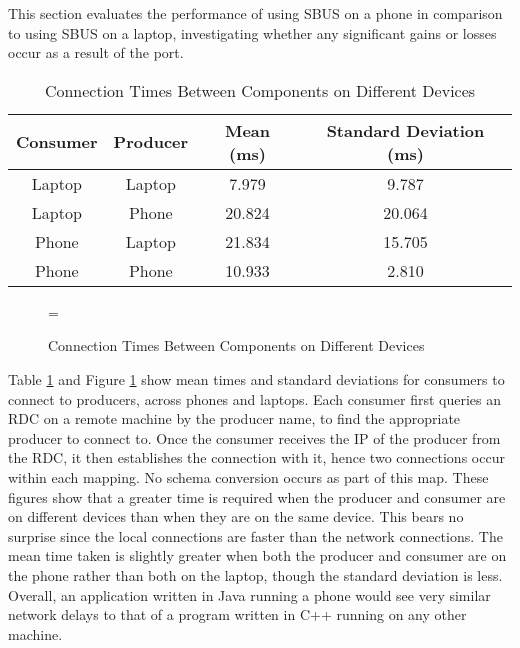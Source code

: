 \documentclass[12pt,twoside,notitlepage]{report}
\begin{document}
This section evaluates the performance of using SBUS on a phone in comparison to using SBUS on a laptop, investigating whether any significant gains or losses occur as a result of the port.

\begin{table}[tbh]
\centering

\begin{tabular}{c c c c}
\hline\hline

Consumer & Producer & Mean (ms) & Standard Deviation (ms) \\
\hline

Laptop	&	Laptop	& 7.979 	& 9.787 \\
Laptop	&	Phone	& 20.824 	& 20.064 \\
Phone	&	Laptop	& 21.834	& 15.705 \\
Phone	& 	Phone	& 10.933	& 2.810 \\
\hline
\end{tabular}

\caption{Connection Times Between Components on Different Devices}
\label{tab:map_times}
\end{table}

\begin{figure}[tbh]
\epsfxsize=\hsize
\centerline{}
\caption{Connection Times Between Components on Different Devices}
\label{fig:map_times}
\end{figure}

Table \ref{tab:map_times} and Figure \ref{fig:map_times} show mean times and standard deviations for consumers to connect to producers, across phones and laptops.
Each consumer first queries an RDC on a remote machine by the producer name, to find the appropriate producer to connect to. 
Once the consumer receives the IP of the producer from the RDC, it then establishes the connection with it, hence two connections occur within each mapping. 
No schema conversion occurs as part of this map. 
These figures show that a greater time is required when the producer and consumer are on different devices than when they are on the same device. 
This bears no surprise since the local connections are faster than the network connections. 
The mean time taken is slightly greater when both the producer and consumer are on the phone rather than both on the laptop, though the standard deviation is less. 
Overall, an application written in Java running a phone would see very similar network delays to that of a program written in C++ running on any other machine.
\end{document}
